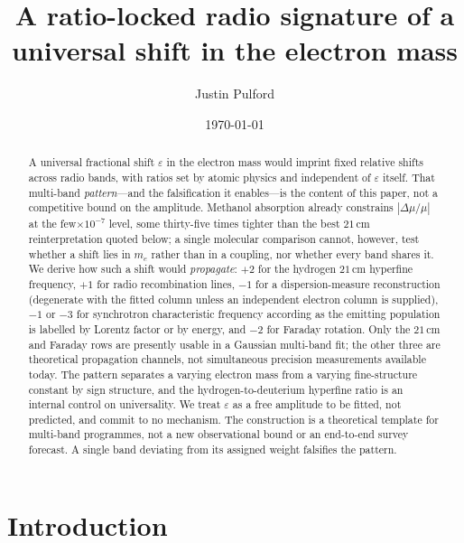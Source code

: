 \documentclass[aps,prd,twocolumn,superscriptaddress,nofootinbib,10pt]{revtex4-2}
\begin{document}
\title{A ratio-locked radio signature of a universal shift in the electron mass}

\author{Justin Pulford}

\date{\today}

\begin{abstract}
A universal fractional shift $\varepsilon$ in the electron mass would imprint fixed relative
shifts across radio bands, with ratios set by atomic physics and independent of $\varepsilon$
itself. That multi-band \emph{pattern}---and the falsification it enables---is the content of this
paper, not a competitive bound on the amplitude. Methanol absorption already constrains
$|\Delta\mu/\mu|$ at the few$\times 10^{-7}$ level, some thirty-five times tighter than the best
$21\,$cm reinterpretation quoted below; a single molecular comparison cannot, however, test whether
a shift lies in $m_e$ rather than in a coupling, nor whether every band shares it. We derive how
such a shift would \emph{propagate}: $+2$ for the hydrogen $21\,$cm hyperfine frequency, $+1$ for
radio recombination lines, $-1$ for a dispersion-measure reconstruction (degenerate with the fitted
column unless an independent electron column is supplied), $-1$ or $-3$ for synchrotron
characteristic frequency according as the emitting population is labelled by Lorentz factor or by
energy, and $-2$ for Faraday rotation. Only the $21\,$cm and Faraday rows are presently usable in a
Gaussian multi-band fit; the other three are theoretical propagation channels, not simultaneous
precision measurements available today. The pattern separates a varying electron mass from a
varying fine-structure constant by sign structure, and the hydrogen-to-deuterium hyperfine ratio is
an internal control on universality. We treat $\varepsilon$ as a free amplitude to be fitted, not
predicted, and commit to no mechanism. The construction is a theoretical template for multi-band
programmes, not a new observational bound or an end-to-end survey forecast. A single band
deviating from its assigned weight falsifies the pattern.
\end{abstract}

\maketitle

\section{Introduction}\label{sec:intro}
\end{document}
